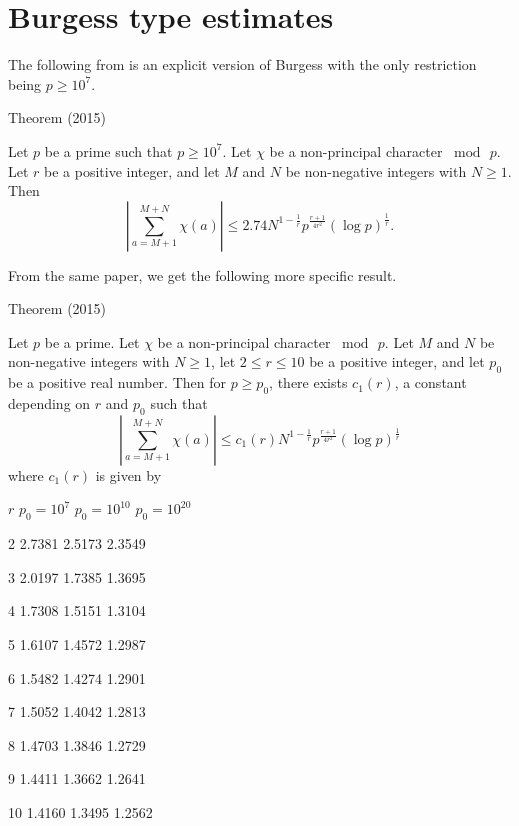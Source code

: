 \section{Burgess type estimates}


The following from 
\cite{Trevino*15-2}
is an explicit version of Burgess with the only restriction being
$p\ge 10^7$.
\par 
\begin{thm}{Theorem (2015)}

Let $p$ be a prime such that $p \ge 10^7$. Let $\chi$ be a non-principal character $\bmod{\,p}$. Let $r$ be a positive integer, and let $M$ and $N$ be non-negative integers with $N\ge 1$. Then
$$
\left|\sum_{a=M+1}^{M+N}\chi(a)\right|
\le 2.74 N^{1-\frac{1}{r}}
p^{\frac{r+1}{4r^2}}(\log{p})^{\frac{1}{r}}.
$$
\end{thm}

\par 
  From the same paper, we get the following more specific result.
\par 
\begin{thm}{Theorem (2015)}

Let $p$ be a prime. Let $\chi$ be a non-principal character
$\bmod{\,p}$. Let $M$ and $N$ be non-negative integers with $N\ge 1$,
let $2\le r\le 10$ be a positive integer, and let $p_0$ be a positive
real number. Then for $p \ge p_0$, there exists $c_1(r)$, a constant
depending on $r$ and $p_0$ such that 
$$
\left|\sum_{a=M+1}^{M+N}\chi(a)\right|
\le
c_1(r) N^{1-\frac{1}{r}} p^{\frac{r+1}{4r^2}}(\log{p})^{\frac{1}{r}}
$$
where $c_1(r)$ is given by

  
  
    
      $r$
      $p_0=10^7$
      $p_0=10^{10}$
      $p_0=10^{20}$
    
  
  
    2
    2.7381
    2.5173
    2.3549
  
  
    3
    2.0197
    1.7385
    1.3695
  
  
    4
    1.7308
    1.5151
    1.3104
  
  
    5
    1.6107
    1.4572
    1.2987
  
  
    6
    1.5482
    1.4274
    1.2901
  
  
    7
    1.5052
    1.4042
    1.2813
  
  
    8
    1.4703
    1.3846
    1.2729
  
  
    9
    1.4411
    1.3662
    1.2641
  
  
    10
    1.4160
    1.3495
    1.2562
  


\end{thm}

